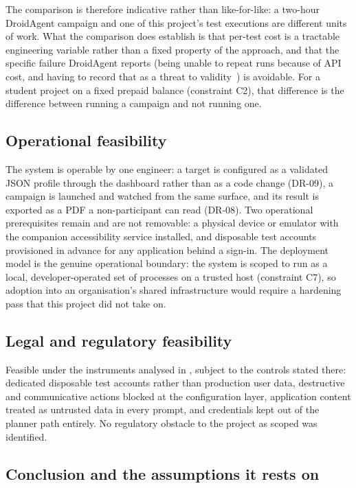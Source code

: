 The comparison is therefore indicative rather than like-for-like: a two-hour
DroidAgent campaign and one of this project's test executions are different
units of work. What the comparison does establish is that per-test cost is a
tractable engineering variable rather than a fixed property of the approach,
and that the specific failure DroidAgent reports (being unable to repeat runs
because of API cost, and having to record that as a threat to
validity~\cite{droidagent}) is avoidable. For a student project on a fixed
prepaid balance (constraint C2), that difference is the difference between
running a campaign and not running one.

\subsection*{Operational feasibility}

The system is operable by one engineer: a target is configured as a validated
JSON profile through the dashboard rather than as a code change (DR-09), a
campaign is launched and watched from the same surface, and its result is
exported as a PDF a non-participant can read (DR-08). Two operational
prerequisites remain and are not removable: a physical device or emulator with
the companion accessibility service installed, and disposable test accounts
provisioned in advance for any application behind a sign-in. The deployment
model is the genuine operational boundary: the system is scoped to run as a
local, developer-operated set of processes on a trusted host (constraint C7),
so adoption into an organisation's shared infrastructure would require a
hardening pass that this project did not take on.

\subsection*{Legal and regulatory feasibility}

Feasible under the instruments analysed in , subject to the
controls stated there: dedicated disposable test accounts rather than
production user data, destructive and communicative actions blocked at the
configuration layer, application content treated as untrusted data in every
prompt, and credentials kept out of the planner path entirely. No regulatory
obstacle to the project as scoped was identified.

\subsection*{Conclusion and the assumptions it rests on}

